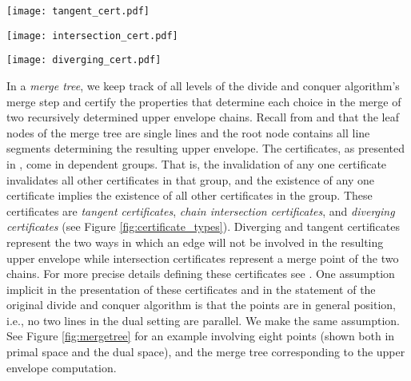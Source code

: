 \documentclass[11pt]{article}
\begin{document}
\begin{figure*}[!ht]  
\begin{minipage}{0.3\textwidth}
\begin{center}
\texttt{[image: tangent\_cert.pdf]}
\end{center}
\end{minipage}
\begin{minipage}{0.3\textwidth}
\begin{center}
\texttt{[image: intersection\_cert.pdf]}
\end{center}
\end{minipage}
\begin{minipage}{0.3\textwidth}
\begin{center}
\texttt{[image: diverging\_cert.pdf]}
\end{center}
\end{minipage}
\caption{Convex hull certificates \cite{Basch99MobileData} in the dual setting showing the two chains involved in red and black.  Left: Tangent certificates guarantee that line $c$ is below the vertex $ab$ and that the slope of line $c$ is greater than the slope of $a$ and less than the slope of $b$.  Center: Intersection certificates guarantee that the vertex $ab$ is to the left of vertex $cd$ and below line $c$ and that vertex $cd$ is to the right of vertex $ab$ and below line $b$.  Right: Diverging certificates guarantee that $b$'s slope is less than or equal to the slope of line $a$ and that the vertex $cb$ is below line $a$.  
}
\label{fig:certificate_types}
\end{figure*}


In a \emph{merge tree}, we keep track of all levels of the divide and conquer algorithm's merge step and certify the properties that determine each choice in the merge of two recursively determined upper envelope chains. 
Recall from \cite{Basch99MobileData} and \cite{Atallah85Dynamic} that the leaf nodes of the merge tree are single lines and the root node contains all line segments determining the resulting upper envelope.  
 The certificates, as presented in \cite{Basch99MobileData}, come in dependent groups. That is, the invalidation of any one certificate invalidates all other certificates in that group, and the existence of any one certificate implies the existence of all other certificates in the group.  
These certificates are \emph{tangent certificates},  
\emph{chain intersection certificates}, 
and \emph{diverging certificates} 
(see Figure \ref{fig:certificate_types}).  Diverging and tangent
certificates represent the two ways in which an edge will not be
involved in the resulting upper envelope while intersection
certificates represent a merge point of the two chains.  For more
precise details defining these certificates see
\cite{Basch99MobileData}.  One assumption implicit in the presentation
of these certificates and in the statement of the original divide and
conquer algorithm is that the points are in general
position, i.e., no two lines in the dual setting are
parallel.  
We make the same assumption. See Figure \ref{fig:mergetree} for an
example involving eight points (shown both in primal space and the dual
space), and the merge tree corresponding
to the  upper envelope computation.
\end{document}
